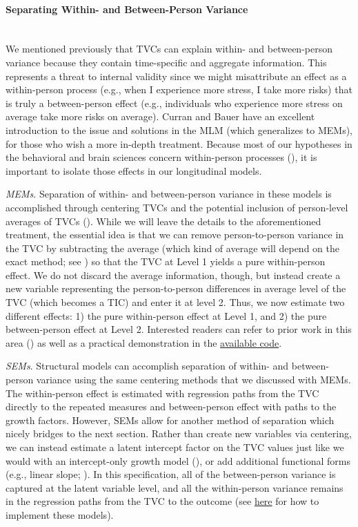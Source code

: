 \documentclass[11pt]{article}
\newcommand{\subsubsubsection}[1]{\paragraph{#1}\mbox{}\\}  %
\begin{document}
\subsubsubsection{Separating Within- and Between-Person Variance}
We mentioned previously that TVCs can explain within- and between-person variance because they contain time-specific and aggregate information. This represents a threat to internal validity since we might misattribute an effect as a within-person process (e.g., when I experience more stress, I take more risks) that is truly a between-person effect (e.g., individuals who experience more stress on average take more risks on average). Curran and Bauer \citeyear{curran_disaggregation_2011} have an excellent introduction to the issue and solutions in the MLM (which generalizes to MEMs), for those who wish a more in-depth treatment. Because most of our hypotheses in the behavioral and brain sciences concern within-person processes (\cite{curran_separation_2014,curran_disaggregation_2011,hamaker_critique_2015}), it is important to isolate those effects in our longitudinal models.

\textit{MEMs}. Separation of within- and between-person variance in these models is accomplished through centering TVCs and the potential inclusion of person-level averages of TVCs (\cite{curran_disaggregation_2011}). While we will leave the details to the aforementioned treatment, the essential idea is that we can remove person-to-person variance in the TVC by subtracting the average (which kind of average will depend on the exact method; see \cite{curran_disaggregation_2011}) so that the TVC at Level 1 yields a pure within-person effect. We do not discard the average information, though, but instead create a new variable representing the person-to-person differences in average level of the TVC (which becomes a TIC) and enter it at level 2. Thus, we now estimate two different effects: 1) the pure within-person effect at Level 1, and 2) the pure between-person effect at Level 2. Interested readers can refer to prior work in this area (\cite{curran_disaggregation_2011,mcneish_flexible_2020}) as well as a practical demonstration in the \href{https://e-m-mccormick.github.io/static/longitudinal-primer/05-covariates.html#within--and-betwen-person-variance}{available code}.

\textit{SEMs}. Structural models can accomplish separation of within- and between-person variance using the same centering methods that we discussed with MEMs. The within-person effect is estimated with regression paths from the TVC directly to the repeated measures and between-person effect with paths to the growth factors. However, SEMs allow for another method of separation which nicely bridges to the next section. Rather than create new variables via centering, we can instead estimate a latent intercept factor on the TVC values just like we would with an intercept-only growth model (\cite{hamaker_critique_2015}), or add additional functional forms (e.g., linear slope; \cite{curran_separation_2014}). In this specification, all of the between-person variance is captured at the latent variable level, and all the within-person variance remains in the regression paths from the TVC to the outcome (see \href{https://e-m-mccormick.github.io/static/longitudinal-primer/05-covariates.html#within--and-betwen-person-variance}{here} for how to implement these models).
\end{document}
